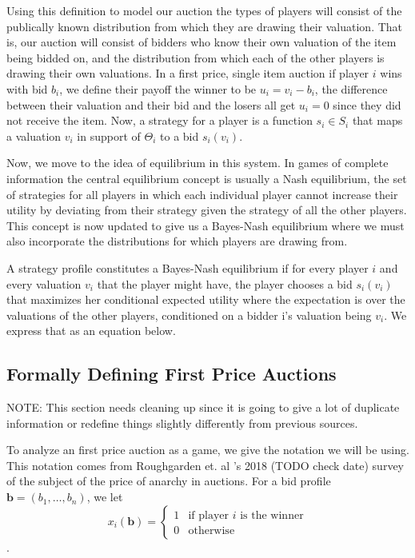 \documentclass[12pt,twoside]{reedthesis}
\begin{document}
Using this definition to model our auction the types of players will consist of the publically known distribution from which they are drawing their valuation. That is, our auction will consist of bidders who know their own valuation of the item being bidded on, and the distribution from which each of the other players is drawing their own valuations. In a first price, single item auction if player $i$ wins with bid $b_i$, we define their payoff the winner to be $u_i = v_i - b_i$, the difference between their valuation and their bid and the losers all get $u_i = 0$ since they did not receive the item. Now, a strategy for a player is a function $s_i \in S_i$ that maps a valuation $v_i$ in support of $\Theta_i$ to a bid $s_i(v_i)$. 

Now, we move to the idea of equilibrium in this system. In games of complete information the central equilibrium concept is usually a Nash equilibrium, the set of strategies for all players in which each individual player cannot increase their utility by deviating from their strategy given the strategy of all the other players. This concept is now updated to give us a Bayes-Nash equilibrium where we must also incorporate the distributions for which players are drawing from. 

\begin{dfn}
	A strategy profile constitutes a Bayes-Nash equilibrium if for every player $i$ and every valuation $v_i$ that the player might have, the player chooses a bid $s_i(v_i)$ that maximizes her conditional expected utility where the expectation is over the valuations of the other players, conditioned on a bidder i's valuation being $v_i$. We express that as an equation below.
\end{dfn}

\subsection{Formally Defining First Price Auctions}
NOTE: This section needs cleaning up since it is going to give a lot of duplicate information or redefine things slightly differently from previous sources.

To analyze an first price auction as a game, we give the notation we will be using. This notation comes from Roughgarden et. al 's 2018 (TODO check date) survey of the subject of the price of anarchy in auctions. For a bid profile $\textbf{b} = (b_1, \ldots, b_n)$, we let 
\[
	x_i(\textbf{b}) =
	\begin{cases}
		1 & \text{if player $i$ is the winner} \\
		0 & \text{otherwise}
	\end{cases}
\].
\end{document}
